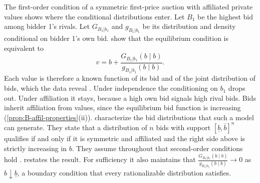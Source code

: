 The first-order condition of a symmetric first-price auction with affiliated private values shows where
the conditional distributions enter. Let $B_1$ be the highest bid among bidder 1's rivals. Let
$G_{B_1|b_1}$ and $g_{B_1|b_1}$ be its distribution and density conditional on bidder 1's own bid.
\citet[eq.~4, p.~175]{LiPerrigneVuong2002} show that the equilibrium condition is equivalent to
\begin{equation*}
v = b + \frac{G_{B_1|b_1}(b \mid b)}{g_{B_1|b_1}(b \mid b)} .
\end{equation*}
Each value is therefore a known function of its bid and of the joint distribution of bids, which the data
reveal \citep[Section~3.1, eq.~3.1]{AtheyHaile2007}. Under independence the conditioning on $b_1$ drops out.
Under affiliation it stays, because a high own bid signals high rival bids. Bids inherit affiliation from
values, since the equilibrium bid function is increasing (\cref{prop:B-affil-properties}(ii)).
\citet[Proposition~1, p.~175]{LiPerrigneVuong2002} characterize the bid distributions that such a model can
generate. They state that a distribution of $n$ bids with support $[\underline b, \bar b]^n$ qualifies if and only if it is symmetric and
affiliated and the right side above is strictly increasing in $b$. They assume throughout that second-order
conditions hold \citep[footnote~7, p.~174]{LiPerrigneVuong2002}.  restates the result. For
sufficiency it also maintains that $\frac{G_{B_1|b_1}(b \mid b)}{g_{B_1|b_1}(b \mid b)} \to 0$ as $b \downarrow \underline b$, a boundary
condition that every rationalizable distribution satisfies.
